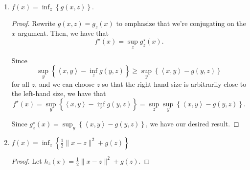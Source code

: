 \documentclass[11pt]{amsart}
\begin{document}
\begin{enumerate}
\begin{enumerate}
\begin{proof}
    \begin{align*}
      f^\star\left(x\right)
      &= \sup_{y} \left\{\left\langle x, y \right\rangle - f(x)\right\} \\
      &= \sup_{y} \left\{\left\langle x, y \right\rangle - g(y - a)\right\} \\
      &= \sup_{y} \left\{\left\langle x, y \right\rangle -
        \left\langle y, b \right\rangle - g(y - a)\right\} \\
      &= \sup_{y} \left\{\left\langle x - b, y \right\rangle - g(y - a)\right\} \\
      &= \sup_{y} \left\{
        \left\langle x - b, a \right\rangle + 
        \left\langle x - b, y - a \right\rangle - g(y - a)\right\} \\
      &= \left\langle x - b, a \right\rangle + \sup_{y} \left\{
        \left\langle x - b, y - a \right\rangle - g(y - a)\right\} \\
      &= \left\langle x - b, a \right\rangle + g^\star(x - b)
    \end{align*}
    since shiftfing by $a$ does not change the supremum.
  \end{proof}
\item $f(x) = \inf_z \left\{g(x,z)\right\}$.
  \begin{proof}
    Rewrite $g(x,z) = g_z(x)$ to emphasize that we're conjugating on the $x$
    argument. Then, we have that
    \begin{equation*}
      \boxed{f^\star\left(x\right) = \sup_z g_z^\star(x).}
    \end{equation*}

    Since
    \begin{equation*}
      \sup_{y} \left\{\left\langle x, y \right\rangle - \inf_zg(y, z)\right\}
      \geq
      \sup_{y} \left\{\left\langle x, y \right\rangle - g(y, z)\right\}
    \end{equation*}
    for all $z$, and we can choose $z$ so that the right-hand size is
    arbitrarily close to the left-hand size, we have that
    \begin{equation*}
      f^\star\left(x\right)
      = \sup_{y} \left\{\left\langle x, y \right\rangle - \inf_zg(y, z)\right\}
      = \sup_z\sup_{y} \left\{\left\langle x, y \right\rangle - g(y, z)\right\}.
    \end{equation*}

    Since
    $g^\star_z(x) = \sup_{y} \left\{\left\langle x, y \right\rangle - g(y,
      z)\right\}$, we have our desired result.        
  \end{proof}
\item $f(x) = \inf_z \left\{\frac{1}{2}\|x-z\|^2 + g(z)\right\}$
  \begin{proof}
    Let $h_z(x) = \frac{1}{2}\|x-z\|^2 + g(z)$.



\end{proof}
\end{enumerate}
\end{enumerate}
\end{document}
